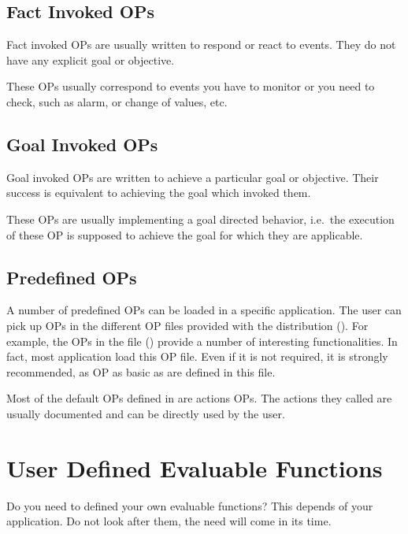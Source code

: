 \subsection{Fact Invoked OPs}

Fact invoked OPs are usually written to respond or react to events. They do not
have any explicit goal or objective.

These OPs usually correspond to events you have to monitor or you need to
check, such as alarm, or change of values, etc.

\subsection{Goal Invoked OPs}

Goal invoked OPs are written to achieve a particular goal or objective.
Their success is equivalent to achieving the goal which invoked them.

These OPs are usually implementing a goal directed behavior, i.e.\ the execution
of these OP is supposed to achieve the goal for which they are applicable.

\subsection{Predefined OPs}

A number of predefined OPs can be loaded in a specific application. The user
can pick up OPs in the different OP files provided with the distribution
(). For example, the OPs in the file 
() provide a number of interesting functionalities. In
fact, most application load this OP file.  Even if it is not required, it is
strongly recommended, as OP as basic as \code{=} are defined in this file.

Most of the default OPs defined in   are actions OPs. The
actions they called are usually documented and can be directly used by the
user.

\section{User Defined Evaluable Functions}

Do you need to defined your own evaluable functions? This depends of your
application. Do not look after them, the need will come in its time.

